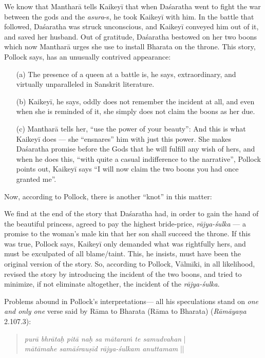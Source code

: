 We know that Mantharā tells Kaikeyī that when Daśaratha went to fight the war between the gods and the {\sl asura}-s, he took Kaikeyī with him. In the battle that followed, Daśaratha was struck unconscious, and Kaikeyī conveyed him out of it, and saved her husband. Out of gratitude, Daśaratha bestowed on her two boons which now Mantharā urges she use to install Bharata on the throne. This story, Pollock says, has an unusually contrived appearance:
\begin{itemize} 
\itemsep=1pt
\item[(a)] The presence of a queen at a battle is, he says, extraordinary, and virtually unparalleled in Sanskrit literature.  

\item[(b)] Kaikeyī, he says, oddly does not remember the incident at all, and even when she is reminded of it, she simply does not claim the boons as her due. 

\item[(c)] Mantharā tells her, “use the power of your beauty”: And this is what Kaikeyī does --- she “ensnares” him with just this power. She makes Daśaratha promise before the Gods that he will fulfill any wish of hers, and when he does this, “with quite a casual indifference to the narrative”, Pollock points out, Kaikeyī says “I will now claim the two boons you had once granted me”. 
\end{itemize}

Now, according to Pollock, there is another “knot” in this matter: 

We find at the end of the story that Daśaratha had, in order to gain the hand of the beautiful princess, agreed to pay the highest bride-price, {\sl rājya-śulka} --- a promise to the woman’s male kin that her son shall succeed the throne. If this was true, Pollock says, Kaikeyī only demanded what was rightfully hers, and must be exculpated of all blame/taint. This, he insists, must have been the original version of the story. So, according to Pollock, Vālmīki, in all likelihood, revised the story by introducing the incident of the two boons, and tried to minimize, if not eliminate altogether, the incident of the {\sl rājya-śulka}.

Problems abound in Pollock’s interpretations— all his speculations stand on {\sl one and only one} verse said by Rāma to Bharata (Rāma to Bharata) ({\sl Rāmāyaṇa} 2.107.3): 
\begin{quote}
{{\sl purā bhrātaḥ pitā naḥ sa mātaraṁ te samudvahan}} |\\
{\sl mātāmahe samāśrauṣīd rājya-śulkam anuttamam} || 
\end{quote}

